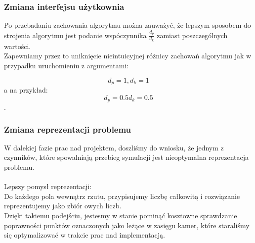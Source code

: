 \documentclass[12pt,a4paper]{article}
\begin{document}
\subsubsection{Zmiana interfejsu użytkownia}
Po przebadaniu zachowania algorytmu można zauważyć,
że lepszym sposobem do strojenia algorytmu jest podanie
wspóczynnika $\frac{d_p}{d_k}$ zamiast poszczególnych wartości. \\ 
Zapewniamy przez to uniknięcie nieintuicyjnej różnicy zachowań algorytmu
jak w przypadku uruchomieniu z argumentami:
\begin{center}
\[d_p = 1, d_k = 1\]
a na przykład: \linebreak
\[d_p = 0.5 d_k = 0.5\].
\end{center}
%
\subsubsection{Zmiana reprezentacji problemu}
W dalekiej fazie prac nad projektem, doszliśmy do wniosku,
że jednym z czynników, które spowalniają przebieg symulacji jest nieoptymalna
reprezentacja problemu.\\ \\
Lepszy pomysł reprezentacji: \\
Do każdego pola wewnątrz rzutu, przypisujemy liczbę całkowitą i rozwiązanie
reprezentujemy jako zbiór owych liczb. \\
Dzięki takiemu podejściu, jestesmy w stanie pominąć kosztowne sprawdzanie
poprawności punktów oznaczonych jako leżące w zasięgu kamer,
które staraliśmy się optymalizować w trakcie prac nad implementacją.
\end{document}
